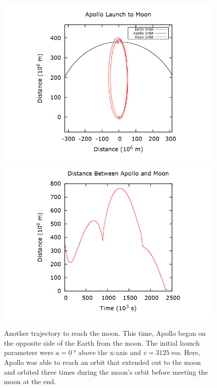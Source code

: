 \documentclass[aps,prl,twocolumn,superscriptaddress]{revtex4-1}
\begin{document}
\begin{figure}[htbp]
  	\begin{center}
 		\includegraphics[scale=0.3]{launch_closest_try.png}
 		\includegraphics[scale=0.3]{dist.png}
  		\caption{Another trajectory to reach the moon. This time, Apollo began on the opposite side of the Earth from the moon. The initial launch parameters were $a = \SI{0}{\degree}$ above the x-axis and $v = \SI{3125}{m\s}$. Here, Apollo was able to reach an orbit that extended out to the moon and orbited three times during the moon's orbit before meeting the moon at the end.}
  		\label{gr:close}
 	\end{center}
\end{figure}
\end{document}
